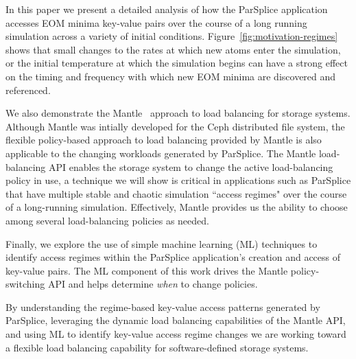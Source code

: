 In this paper we present a detailed analysis of how the ParSplice application
accesses EOM minima key-value pairs over the course of a long running simulation
across a variety of initial conditions. Figure~\ref{fig:motivation-regimes}
shows that small changes to the rates at which new atoms enter the simulation,
or the initial temperature at which the simulation begins can have a strong
effect on the timing and frequency with which new EOM minima are discovered and
referenced.

We also demonstrate the Mantle~\cite{sevilla:sc15-mantle} approach to load
balancing for storage systems.  Although Mantle was intially developed for the
Ceph distributed file system, the flexible policy-based approach to load
balancing provided by Mantle is also applicable to the changing workloads
generated by ParSplice. The Mantle load-balancing API enables the storage
system to change the active load-balancing policy in use, a technique we will
show is critical in applications such as ParSplice that have multiple stable
and chaotic simulation ``access regimes" over the course of a long-running
simulation.  Effectively, Mantle provides us the ability to choose among
several load-balancing policies as needed.

Finally, we explore the use of simple machine learning (ML) techniques to
identify access regimes within the ParSplice application's creation and
access of key-value pairs. The ML component of this work drives the Mantle
policy-switching API and helps determine \emph{when} to change policies.

By understanding the regime-based key-value access patterns generated by
ParSplice, leveraging the dynamic load balancing capabilities of the Mantle
API, and using ML to identify key-value access regime changes we are working
toward a flexible load balancing capability for software-defined storage
systems. 





